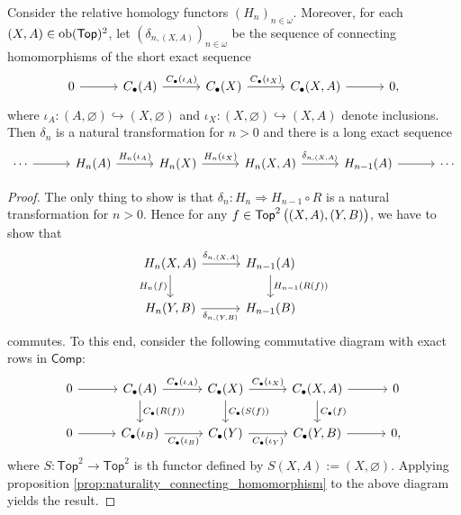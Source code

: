 \begin{corollary}
	Consider the relative homology functors $(H_n)_{n \in \omega}$. Moreover, for each $(X,A) \in \operatorname{ob}(\mathsf{Top})^2$, let $(\delta_{n,(X,A)})_{n \in \omega}$ be the sequence of connecting homomorphisms of the short exact sequence 
	\begin{equation*}
		\begin{tikzcd}[column sep = 7ex]
			0 \arrow[r] & C_\bullet(A) \arrow[r,"C_\bullet(\iota_A)"] & C_\bullet(X) \arrow[r,"C_\bullet(\iota_X)"] & C_\bullet(X,A) \arrow[r] & 0,
		\end{tikzcd}
	\end{equation*}
	\noindent where $\iota_A : (A,\varnothing) \hookrightarrow (X,\varnothing)$ and $\iota_X : (X,\varnothing) \hookrightarrow (X,A)$ denote inclusions. Then $\delta_n$ is a natural transformation for $n > 0$ and there is a long exact sequence
\begin{equation*}
	\begin{tikzcd}[column sep=7ex]
	\cdots \arrow[r] & H_n(A) \arrow[r,"H_n(\iota_A)"] & H_n(X) \arrow[r,"H_n(\iota_X)"] & H_n(X,A) \arrow[r,"\delta_{n,(X,A)}"] & H_{n - 1}(A) \arrow[r] & \cdots
	\end{tikzcd}
\end{equation*}

\end{corollary}

\begin{proof}
	The only thing to show is that $\delta_n : H_n \Rightarrow H_{n - 1} \circ R$ is a natural transformation for $n > 0$. Hence for any $f \in \mathsf{Top}^2\del[1]{(X,A),(Y,B)}$, we have to show that
	\begin{equation*}
		\begin{tikzcd}[column sep=7ex]
			H_n(X,A) \arrow[r,"\delta_{n,(X,A)}"]\arrow[d,"H_n(f)"'] & H_{n - 1}(A)\arrow[d,"H_{n-1}(R(f))"]\\
			H_n(Y,B) \arrow[r,"\delta_{n,(Y,B)}"']& H_{n - 1}(B)
		\end{tikzcd}
	\end{equation*}
	\noindent commutes. To this end, consider the following commutative diagram with exact rows in $\mathsf{Comp}$: 
	\begin{equation*}
		\begin{tikzcd}[column sep=7ex]
			0 \arrow[r] & C_\bullet(A) \arrow[r,"C_\bullet(\iota_A)"]\arrow[d,"C_\bullet(R(f))"] & C_\bullet(X) \arrow[r,"C_\bullet(\iota_X)"]\arrow[d,"C_\bullet(S(f))"] & C_\bullet(X,A) \arrow[r]\arrow[d,"C_\bullet(f)"] & 0\\
			0 \arrow[r] & C_\bullet(\iota_B) \arrow[r,"C_\bullet(\iota_B)"'] & C_\bullet(Y) \arrow[r,"C_\bullet(\iota_Y)"'] & C_\bullet(Y,B) \arrow[r] & 0,
		\end{tikzcd}
	\end{equation*}
	\noindent where $S : \mathsf{Top}^2 \to \mathsf{Top}^2$ is th functor defined by $S(X,A) := (X,\varnothing)$. Applying proposition \ref{prop:naturality_connecting_homomorphism} to the above diagram yields the result.
\end{proof}
